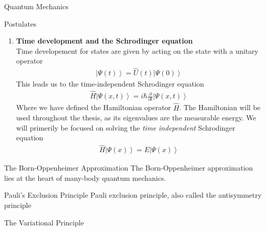 \documentclass[twoside,english]{uiofysmaster}
\begin{document}
\begin{chapter}{Quantum Mechanics}
\begin{section}{Postulates}
\begin{enumerate}
\begin{align}
 				P(\lambda) = \left< \alpha | \lambda \right> \left< \lambda | \alpha \right> = | \left< \alpha | \lambda \right> |^2 
 			\end{align}
 			Which measures the overlap of the two states $\left| \alpha \right>$ and $\left| \lambda \right>$. If they are physically distinguishable, the probability is zero. If the probability is non-zero, we have "mixed states".
 			\item \textbf{Time development and the Schrodinger equation}\\
 			Time developement for states are given by acting on the state with a unitary operator
 			\begin{align}
 				\left| \Psi(t) \right> = \hat U(t) \left| \Psi(0) \right>
 			\end{align}
 			This leads us to the time-independent Schrodinger equation
 			\begin{align}
 				\hat H \left| \Psi(x,t) \right> = i \hbar \frac{\partial}{\partial t} \left| \Psi(x,t) \right> 
 			\end{align}
 			Where we have defined the Hamiltonian operator $\hat H$. The Hamiltonian will be used throughout the thesis, as its eigenvalues are the measurable energy. We will primerily be focused on solving the \textit{time independent} Schrodinger equation
 			\begin{align}
 				\hat H \left| \Psi(x) \right> = E \left| \Psi(x) \right> 
 			\end{align}
 		\end{enumerate}
 	\end{section}


 	\begin{section}{The Born-Oppenheimer Approximation}
 		The Born-Oppenheimer approximation lies at the heart of many-body quantum mechanics. 
 	\end{section}

 	\begin{section}{Pauli's Exclusion Principle}
 		Pauli exclusion principle, also called the antisymmetry principle \cite{Szabo} 
 	\end{section}

	\begin{section}{The Variational Principle}

	\end{section}


\end{chapter}
\end{document}
